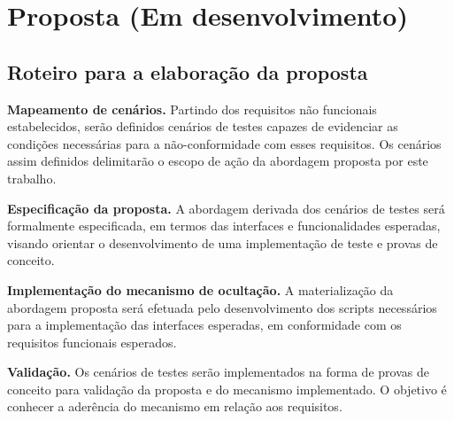 \chapter{Proposta (Em desenvolvimento)}





\section{Roteiro para a elaboração da proposta}

\begin{alineas}
	\item \textbf{Mapeamento de cenários.} Partindo dos requisitos não funcionais estabelecidos, serão definidos cenários de testes capazes de evidenciar as condições necessárias para a não-conformidade com esses requisitos. Os cenários assim definidos delimitarão o escopo de ação da abordagem proposta por este trabalho.
	\item \textbf{Especificação da proposta.} A abordagem derivada dos cenários de testes será formalmente especificada, em termos das interfaces e funcionalidades esperadas, visando orientar o desenvolvimento de uma implementação de teste e provas de conceito.
	\item \textbf{Implementação do mecanismo de ocultação.} A materialização da abordagem proposta será efetuada pelo desenvolvimento dos scripts necessários para a implementação das interfaces esperadas, em conformidade com os requisitos funcionais esperados.
	\item \textbf{Validação.} Os cenários de testes serão implementados na forma de provas de conceito para validação da proposta e do mecanismo implementado. O objetivo é conhecer a aderência do mecanismo em relação aos requisitos.
\end{alineas}